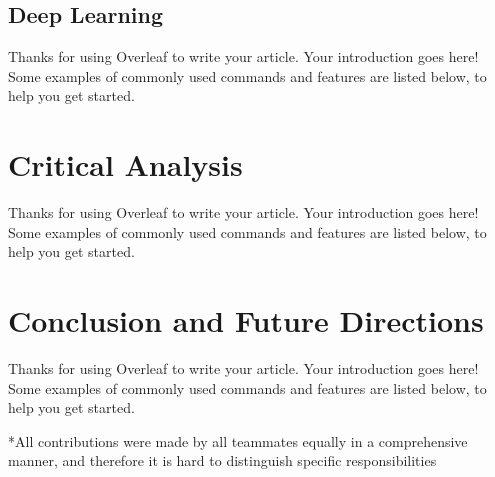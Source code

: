 \documentclass[fleqn,11pt]{olplainarticle}
\begin{document}
\subsection{Deep Learning}\label{dnn}
Thanks for using Overleaf to write your article. Your introduction goes here! Some examples of commonly used commands and features are listed below, to help you get started.

\section{Critical Analysis}\label{analysis}
Thanks for using Overleaf to write your article. Your introduction goes here! Some examples of commonly used commands and features are listed below, to help you get started.

\section{Conclusion and Future Directions}\label{conclu}
Thanks for using Overleaf to write your article. Your introduction goes here! Some examples of commonly used commands and features are listed below, to help you get started.



\small{*All contributions were made by all teammates equally in a comprehensive manner, and therefore it is hard to distinguish specific responsibilities}
\end{document}
